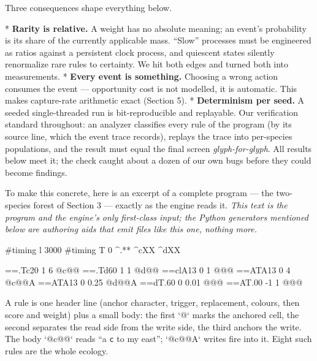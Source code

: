Three consequences shape everything below.

\begitems
* {\bf Rarity is relative.} A weight has no absolute meaning; an
event's probability is its share of the currently applicable mass.
``Slow'' processes must be engineered as ratios against a persistent
clock process, and quiescent states silently renormalize rare rules
to certainty. We hit both edges and turned both into measurements.
* {\bf Every event is something.} Choosing a wrong action consumes
the event --- opportunity cost is not modelled, it is automatic.
This makes capture-rate arithmetic exact (Section 5).
* {\bf Determinism per seed.} A seeded single-threaded run is
bit-reproducible and replayable. Our verification standard
throughout: an analyzer classifies every rule of the program (by its
source line, which the event trace records), replays the trace into
per-species populations, and the result must equal the final screen
{\it glyph-for-glyph}. All results below meet it; the check caught
about a dozen of our own bugs before they could become findings.
\enditems

To make this concrete, here is an excerpt of a complete program ---
the two-species forest of Section 3 --- exactly as the engine reads
it. {\it This text is the program and the engine's only first-class
input; the Python generators mentioned below are authoring aids that
emit files like this one, nothing more.}

\begtt
#timing l 3000        %
#timing T 0           %
^.**                  %
^cXX                  %
^dXX                  %

==.Tc20   1 6         %
@c@@
==.Td60   1 1         %
@d@@
==clA13   0 1         %
@@@
==ATA13   0 4         %
@c@@A
==ATA13   0 0.25      %
@d@@A
==dT.60   0 0.01      %
@@@
==AT.00   -1 1        %
@@@
\endtt

\noindent A rule is one header line (anchor character, trigger,
replacement, colours, then score and weight) plus a small body: the
first `@` marks the anchored cell, the second separates the read
side from the write side, the third anchors the write. The body
`@c@@` reads ``a {\tt c} to my east''; `@c@@A` writes fire into it.
Eight such rules are the whole ecology.

